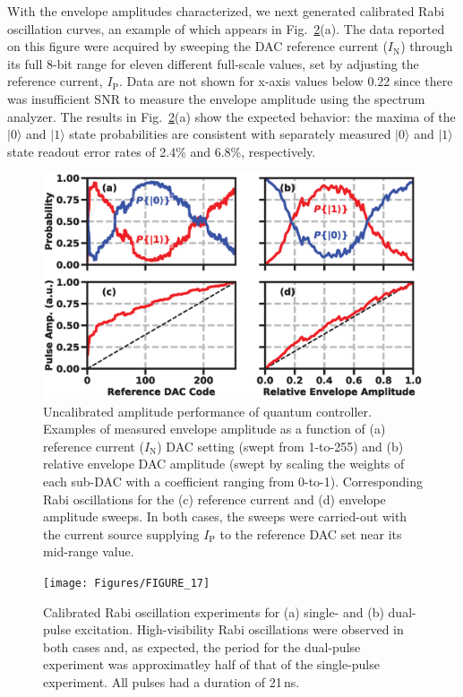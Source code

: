\documentclass[journal]{IEEEtran}
\newcommand{\CR}[1]{{\color{black}#1}}
\begin{document}
\CR{With the envelope amplitudes characterized, we next generated calibrated Rabi oscillation curves, an example of which appears in Fig.~\ref{rabidual}(a).}  The data reported on this figure were acquired by  sweeping the DAC reference current ($I_\text{N}$) through \CR{its full 8-bit range} for eleven different \CR{full-scale values, set by adjusting the reference current, $I_\text{P}$}. Data \CR{are} not shown for x-axis values below 0.22 since there was insufficient SNR to measure the envelope amplitude using the spectrum analyzer. The results in Fig.\CR{~\ref{rabidual}(a)} show the expected behavior: the maxima of the $|0\rangle$ and $|1\rangle$ state probabilities are consistent with separately measured $|0\rangle$ and $|1\rangle$ state readout error rates of 2.4\% and 6.8\%, respectively.
\begin{figure}[bt!]
\centering
\includegraphics[width=\columnwidth]{Figures/FIGURE_16}
\caption{\CR{Uncalibrated amplitude performance of quantum controller. Examples of measured envelope amplitude as a function of (a) reference current ($I_\text{N}$) DAC setting (swept from 1-to-255) and (b) relative envelope DAC amplitude (swept by scaling the weights of each sub-DAC with a coefficient ranging from 0-to-1). Corresponding Rabi oscillations for the (c) reference current and (d) envelope amplitude sweeps. In both cases, the sweeps were carried-out with the current source supplying $I_\text{P}$ to the reference DAC set near its mid-range value. }}\label{cal}
\end{figure}
\begin{figure}[bt!]
\texttt{[image: Figures/FIGURE\_17]}
\caption{\CR{Calibrated Rabi oscillation experiments for (a) single- and (b) dual-pulse excitation. High-visibility Rabi oscillations were observed in both cases and, as expected, the period for the dual-pulse experiment was approximatley half of that of the single-pulse experiment. All pulses had a duration of 21\,ns.}}\label{rabidual}
\end{figure}
\end{document}
